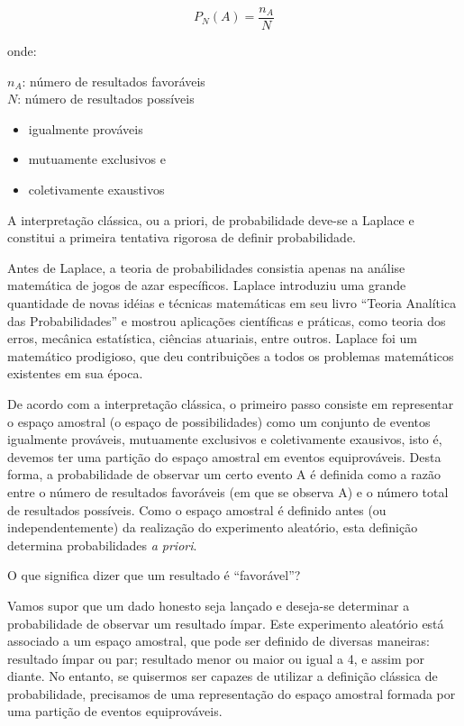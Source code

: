 \documentclass[
]{book}
\providecommand{\tightlist}{%
  \setlength{\itemsep}{0pt}\setlength{\parskip}{0pt}}
\theoremstyle{definition}
\theoremstyle{definition}
\theoremstyle{definition}
\theoremstyle{remark}
\begin{document}
\[P_N(A) = \frac{n_A}{N}\]

onde:

\(n_A\): número de resultados favoráveis\\
\(N\): número de resultados possíveis

\begin{itemize}
\tightlist
\item
  igualmente prováveis\\
\item
  mutuamente exclusivos e\\
\item
  coletivamente exaustivos
\end{itemize}

A interpretação clássica, ou a priori, de probabilidade deve-se a Laplace e constitui a primeira tentativa rigorosa de definir probabilidade.

Antes de Laplace, a teoria de probabilidades consistia apenas na análise matemática de jogos de azar específicos. Laplace introduziu uma grande quantidade de novas idéias e técnicas matemáticas em seu livro ``Teoria Analítica das Probabilidades'' e mostrou aplicações científicas e práticas, como teoria dos erros, mecânica estatística, ciências atuariais, entre outros. Laplace foi um matemático prodigioso, que deu contribuições a todos os problemas matemáticos existentes em sua época.

De acordo com a interpretação clássica, o primeiro passo consiste em representar o espaço amostral (o espaço de possibilidades) como um conjunto de eventos igualmente prováveis, mutuamente exclusivos e coletivamente exausivos, isto é, devemos ter uma partição do espaço amostral em eventos equiprováveis. Desta forma, a probabilidade de observar um certo evento A é definida como a razão entre o número de resultados favoráveis (em que se observa A) e o número total de resultados possíveis. Como o espaço amostral é definido antes (ou independentemente) da realização do experimento aleatório, esta definição determina probabilidades \emph{a priori}.

O que significa dizer que um resultado é ``favorável''?

Vamos supor que um dado honesto seja lançado e deseja-se determinar a probabilidade de observar um resultado ímpar. Este experimento aleatório está associado a um espaço amostral, que pode ser definido de diversas maneiras: resultado ímpar ou par; resultado menor ou maior ou igual a 4, e assim por diante. No entanto, se quisermos ser capazes de utilizar a definição clássica de probabilidade, precisamos de uma representação do espaço amostral formada por uma partição de eventos equiprováveis.
\end{document}
